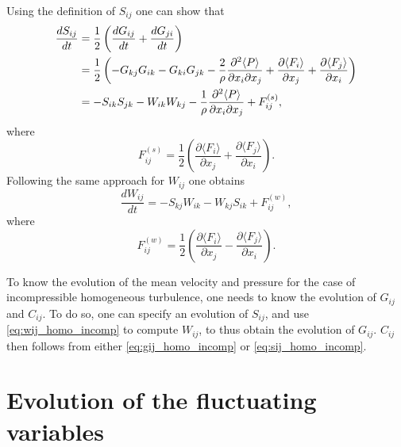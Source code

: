 \documentclass[oneside,a4paper,11pt]{report}
\begin{document}
Using the definition of $S_{ij}$ one can show that
\begin{align}
\label{eq:sij_homo_incomp}
\frac{d S_{ij}}{dt} &= \frac{1}{2} \left ( \frac{d G_{ij}}{dt} + \frac{d G_{ji}}{dt} \right ) \nonumber \\
& = \frac{1}{2} \left ( -G_{kj}G_{ik} - G_{ki}G_{jk} - \frac{2}{\rho} \frac{\partial^2 \langle P \rangle}{\partial x_i \partial x_j}  + \frac{\partial \langle F_i \rangle}{\partial x_j} + \frac{ \partial \langle F_j \rangle}{\partial x_i} \right ) \nonumber \\
& = -S_{ik}S_{jk} - W_{ik}W_{kj} - \frac{1}{\rho} \frac{\partial^2 \langle P \rangle}{\partial x_i \partial x_j} + F^{(s)}_{ij},
\end{align}
where
\begin{equation}
F^{(s)}_{ij} = \frac{1}{2} \left ( \frac{\partial \langle F_i \rangle}{\partial x_j} + \frac{ \partial \langle F_j \rangle}{\partial x_i} \right ).
\end{equation}
Following the same approach for $W_{ij}$ one obtains
\begin{equation}
\label{eq:wij_homo_incomp}
\frac{dW_{ij}}{dt} = -S_{kj}W_{ik} - W_{kj}S_{ik} + F^{(w)}_{ij},
\end{equation}
where
\begin{equation}
F^{(w)}_{ij} = \frac{1}{2} \left ( \frac{\partial \langle F_i \rangle}{\partial x_j} - \frac{ \partial \langle F_j \rangle}{\partial x_i} \right ).
\end{equation}

To know the evolution of the mean velocity and pressure for the case of incompressible homogeneous turbulence, one needs to know the evolution of $G_{ij}$ and $C_{ij}$. To do so, one can specify an evolution of $S_{ij}$, and use \cref{eq:wij_homo_incomp} to compute $W_{ij}$, to thus obtain the evolution of $G_{ij}$. $C_{ij}$ then follows from either \cref{eq:gij_homo_incomp} or \cref{eq:sij_homo_incomp}.


\section{Evolution of the fluctuating variables}

\end{document}
